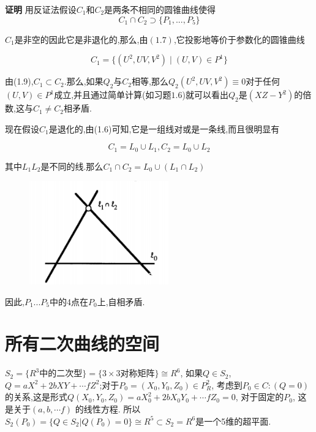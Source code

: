 \documentclass[UTF8]{book}
\begin{document}
		
		\textbf{证明} 用反证法假设$C_{1}$和$C_{2}$是两条不相同的圆锥曲线使得
		\begin{equation*}
		C_{1} \cap C_{2} \supset \{ P_{1},...,P_{5}\}
		\end{equation*}
	
		$C_{1}$是非空的因此它是非退化的,那么,由$ (1.7) $,它投影地等价于参数化的圆锥曲线
		
		\begin{equation*}
		C_{1}=\{(U^{2},UV,V^{2}) \mid (U,V)\in P^{1}\}
		\end{equation*}
	
		由(1.9),$C_{1} \subset C_{2}$.那么,如果$Q_{2}$与$C_{2}$相等,那么$Q_{2}(U^{2},UV,V^{2})\equiv 0$对于任何$(U,V)\in P^{1}$成立,并且通过简单计算(如习题$ 1.6 $)就可以看出$Q_{2}$是$(XZ-Y^{2})$的倍数,这与$C_{1}\ne C_{2}$相矛盾.
		
		
		现在假设$C_{1}$是退化的,由(1.6)可知,它是一组线对或是一条线,而且很明显有
		
		\begin{equation*}
		C_{1}=L_{0}\cup L_{1},C_{2}=L_{0}\cup L_{2}
		\end{equation*}
	
		其中$ L_{1} L_{2} $是不同的线.那么$C_{1}\cap C_{2}=L_{0}\cup (L_{1}\cap L_{2})$
	\begin{figure}[H]
	  \centering
	  \includegraphics[width=6cm]{19.jpg}
	\end{figure}
		因此,$P_{1}...P_{5}$中的4点在$P_{0}$上,自相矛盾.
		
	\section{所有二次曲线的空间}
		$S_{2}=\{R^{3} \text{中的二次型}\}=\{3\times3\text{对称矩阵}\}\cong R^{6}$, 如果$Q\in S_{2}$, $Q=aX^{2}+2bXY+\cdots fZ^{2}$;对于$P_{0}=(X_{0},Y_{0},Z_{0})\in P^{2}_{R}$, 考虑到$P_{0}\in C:(Q=0)$的关系,这是形式$Q(X_{0},Y_{0},Z_{0})=aX^{2}_{0}+2bX_{0}Y_{0}+\cdots fZ_{0}=0$, 对于固定的$P_{0}$, 这是关于$(a,b,\cdots f)$ 的线性方程. 所以$S_{2}(P_{0})=\{Q\in S_{2}|Q(P_{0})=0\}\cong R^{5}\subset S_{2}=R^{6}$是一个5维的超平面.
		
\end{document}
